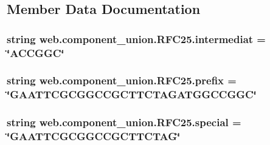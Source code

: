 \subsection{Member Data Documentation}
\hypertarget{classweb_1_1component__union_1_1_r_f_c25_aa0147ee39e138732307cb519eb0f1bd2}{
\subsubsection[{intermediat}]{\setlength{\rightskip}{0pt plus 5cm}string web.\-component\-\_\-union.\-R\-F\-C25.\-intermediat = \char`\"{}A\-C\-C\-G\-G\-C\char`\"{}\hspace{0.3cm}{\ttfamily [static]}}}\label{classweb_1_1component__union_1_1_r_f_c25_aa0147ee39e138732307cb519eb0f1bd2}
\hypertarget{classweb_1_1component__union_1_1_r_f_c25_a587bc92d42da35b284da4ed8640671b4}{
\subsubsection[{prefix}]{\setlength{\rightskip}{0pt plus 5cm}string web.\-component\-\_\-union.\-R\-F\-C25.\-prefix = \char`\"{}G\-A\-A\-T\-T\-C\-G\-C\-G\-G\-C\-C\-G\-C\-T\-T\-C\-T\-A\-G\-A\-T\-G\-G\-C\-C\-G\-G\-C\char`\"{}\hspace{0.3cm}{\ttfamily [static]}}}\label{classweb_1_1component__union_1_1_r_f_c25_a587bc92d42da35b284da4ed8640671b4}
\hypertarget{classweb_1_1component__union_1_1_r_f_c25_a8a8f68d525379ed3db9ab285a202d4fc}{
\subsubsection[{special}]{\setlength{\rightskip}{0pt plus 5cm}string web.\-component\-\_\-union.\-R\-F\-C25.\-special = \char`\"{}G\-A\-A\-T\-T\-C\-G\-C\-G\-G\-C\-C\-G\-C\-T\-T\-C\-T\-A\-G\char`\"{}\hspace{0.3cm}{\ttfamily [static]}}}\label{classweb_1_1component__union_1_1_r_f_c25_a8a8f68d525379ed3db9ab285a202d4fc}
